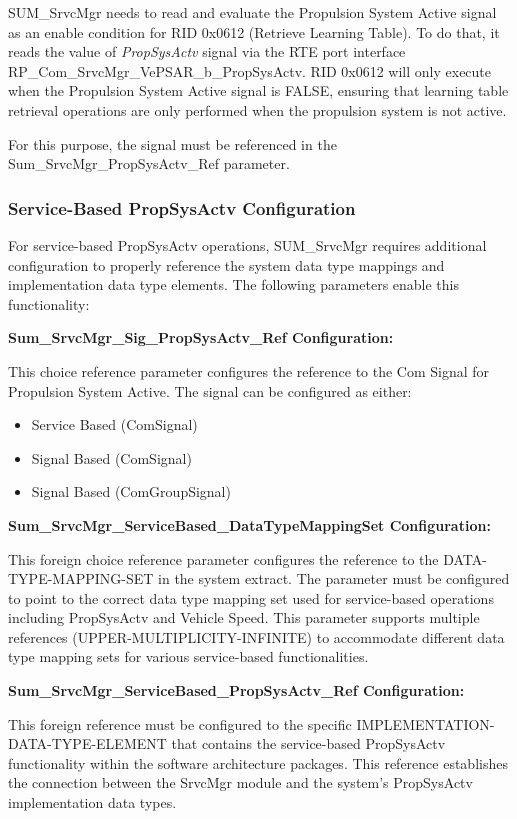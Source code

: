 SUM\_SrvcMgr needs to read and evaluate the Propulsion System Active signal as an enable condition for RID 0x0612 (Retrieve Learning Table).
To do that, it reads the value of \textit{PropSysActv} signal via the RTE port interface RP\_Com\_SrvcMgr\_VePSAR\_b\_PropSysActv.
RID 0x0612 will only execute when the Propulsion System Active signal is FALSE, ensuring that learning table retrieval operations are only performed when the propulsion system is not active.

For this purpose, the signal must be referenced in the Sum\_SrvcMgr\_PropSysActv\_Ref parameter.

\subsubsection{Service-Based PropSysActv Configuration}
\label{sec:servicebasedpropsysactv}
For service-based PropSysActv operations, SUM\_SrvcMgr requires additional configuration to properly reference the system data type mappings and implementation data type elements. The following parameters enable this functionality:

\textbf{Sum\_SrvcMgr\_Sig\_PropSysActv\_Ref Configuration:}

This choice reference parameter configures the reference to the Com Signal for Propulsion System Active. The signal can be configured as either:
\begin{itemize}
  \item Service Based (ComSignal)
	\item Signal Based (ComSignal)
	\item Signal Based (ComGroupSignal)
\end{itemize}

\textbf{Sum\_SrvcMgr\_ServiceBased\_DataTypeMappingSet Configuration:}

This foreign choice reference parameter configures the reference to the DATA-TYPE-MAPPING-SET in the system extract. The parameter must be configured to point to the correct data type mapping set used for service-based operations including PropSysActv and Vehicle Speed. This parameter supports multiple references (UPPER-MULTIPLICITY-INFINITE) to accommodate different data type mapping sets for various service-based functionalities.

\textbf{Sum\_SrvcMgr\_ServiceBased\_PropSysActv\_Ref Configuration:}

This foreign reference must be configured to the specific IMPLEMENTATION-DATA-TYPE-ELEMENT that contains the service-based PropSysActv functionality within the software architecture packages. This reference establishes the connection between the SrvcMgr module and the system's PropSysActv implementation data types.

